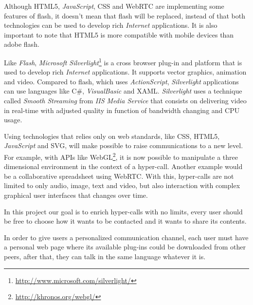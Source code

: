   Although \ac{HTML}5, \emph{JavaScript}, \ac{CSS} and \ac{WebRTC} are implementing some features of flash, it doesn't mean that flash will be replaced, instead of that both technologies can be used to develop rich \emph{Internet} applications. It is also important to note that \ac{HTML}5 is more compatible with mobile devices than adobe flash. 

  Like \emph{Flash}, \emph{Microsoft Silverlight}\footnote{\url{http://www.microsoft.com/silverlight/}} is a cross browser plug-in and platform that is used to develop rich \emph{Internet} applications. It supports vector graphics, animation and video. Compared to flash, which uses \emph{ActionScript}, \emph{Silverlight} applications can use languages like C\#, \emph{VisualBasic} and \ac{XAML}. \emph{Silverlight} uses a technique called \emph{Smooth Streaming} from \emph{IIS Media Service} that consists on delivering video in real-time with adjusted quality in function of bandwidth changing and \ac{CPU} usage.

  Using technologies that relies only on web standards, like \ac{CSS}, \ac{HTML}5, \emph{JavaScript} and \ac{SVG}, will make possible to raise communications to a new level. For example, with \ac{API}s like WebGL\footnote{\url{http://khronos.org/webgl/}}, it is now possible to manipulate a three dimensional environment in the context of a hyper-call. Another example would be a collaborative spreadsheet using \ac{WebRTC}. With this, hyper-calls are not limited to only audio, image, text and video, but also interaction with complex graphical user interfaces that changes over time.

  In this project our goal is to enrich hyper-calls with no limits, every user should be free to choose how it wants to be contacted and it wants to share its contents.

  In order to give users a personalized communication channel, each user must have a personal web page where its available plug-ins could be downloaded from other peers, after that, they can talk in the same language whatever it is.
